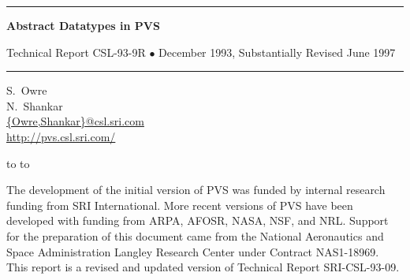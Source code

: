 \documentclass[11pt,twoside]{book}
\begin{document}
\begin{titlepage}
\renewcommand{\thepage}{title}
\vspace*{1in}
\noindent
\rule[1pt]{\textwidth}{2pt}
\begin{center}
\textbf{\pvstitle Abstract Datatypes in PVS}
\end{center}
\begin{flushright}
{\Large Technical Report CSL-93-9R {\smaller$\bullet$} December 1993, Substantially Revised June 1997}
\end{flushright}
\rule[1in]{\textwidth}{2pt}
\vspace*{2in}
\begin{flushleft}
S.~Owre\\
N.~Shankar\\
{\smaller\url{{Owre,Shankar}@csl.sri.com}}\\
{\smaller\url{http://pvs.csl.sri.com/}}
\end{flushleft}
\vspace*{1in}
\vbox{\hbox to %
\hbox to }
\end{titlepage}

\pagestyle{fancy}
\renewcommand{\chaptermark}[1]{\markboth{{\em #1}}{}\markright{{\em #1}}}
\renewcommand{\sectionmark}[1]{\markright{\thesection \em \ #1}}
\lhead[\thepage]{\rightmark}
\cfoot{}
\rhead[\leftmark]{\thepage}
\thispagestyle{empty}

\newpage
\renewcommand{\thepage}{ack}
\vspace*{6in}\noindent
The development of the
initial version of PVS was funded by internal research funding from SRI
International.  More recent versions of PVS have been developed with
funding from ARPA, AFOSR, NASA, NSF, and NRL.  Support for the preparation
of this document came from the National Aeronautics and Space
Administration Langley Research Center under Contract NAS1-18969.  This
report is a revised and updated version of Technical Report
SRI-CSL-93-09.
\newpage
{}
\setcounter{page}{1}
\end{document}
